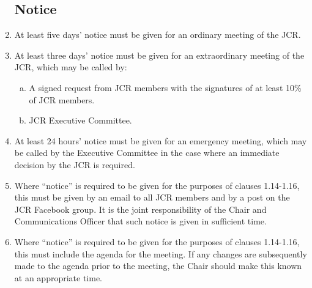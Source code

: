 \documentclass[12pt]{article}
\begin{document}
\begin{enumerate}
    \subsection{Notice}
    \item At least five days’ notice must be given for an ordinary meeting of the JCR.
    \item At least three days’ notice must be given for an extraordinary meeting of the JCR, which may be called by:
    \begin{enumerate}[(a)]
        \item A signed request from JCR members with the signatures of at least 10\% of JCR members.
        \item JCR Executive Committee.
    \end{enumerate}
    \item At least 24 hours’ notice must be given for an emergency meeting, which may be called by the Executive Committee in the case where an immediate decision by the JCR is required.
    \item Where “notice” is required to be given for the purposes of clauses 1.14-1.16, this must be given by an email to all JCR members and by a post on the JCR Facebook group. It is the joint responsibility of the Chair and Communications Officer that such notice is given in sufficient time.
    \item Where “notice” is required to be given for the purposes of clauses 1.14-1.16, this must include the agenda for the meeting. If any changes are subsequently made to the agenda prior to the meeting, the Chair should make this known at an appropriate time.

\end{enumerate}
\end{document}
